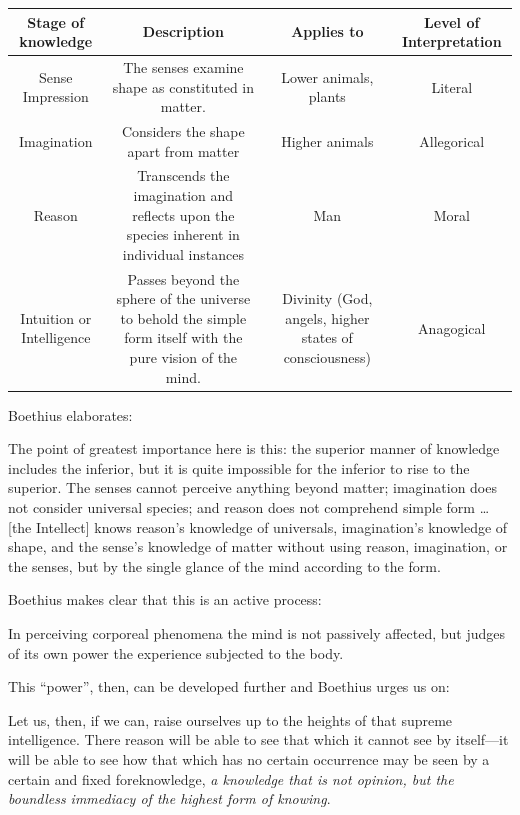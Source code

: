 \begin{table}[h]\scriptsize
\begin{tabular}{cccc}\toprule 
Stage of knowledge &
Description &
Applies to &
Level of Interpretation\\\midrule
Sense Impression &
The senses examine shape as constituted in matter. &
Lower animals, plants &
Literal\\\midrule
Imagination &
Considers the shape apart from matter &
Higher animals &
Allegorical\\\midrule
Reason &
Transcends the imagination and reflects upon the species inherent in individual instances &
Man &
Moral\\\midrule
Intuition or Intelligence &
Passes beyond the sphere of the universe to behold the simple form itself with the pure vision of the mind. &
Divinity (God, angels, higher states of consciousness) &
Anagogical\\\bottomrule
\end{tabular}
\end{table}
Boethius elaborates:

\begin{quotex}
The point of greatest importance here is this: the superior manner of knowledge includes the inferior, but it is quite impossible for the inferior to rise to the superior. The senses cannot perceive anything beyond matter; imagination does not consider universal species; and reason does not comprehend simple form … [the Intellect] knows reason's knowledge of universals, imagination's knowledge of shape, and the sense's knowledge of matter without using reason, imagination, or the senses, but by the single glance of the mind according to the form.

\end{quotex}
Boethius makes clear that this is an active process:

\begin{quotex}
In perceiving corporeal phenomena the mind is not passively affected, but judges of its own power the experience subjected to the body.

\end{quotex}
This “power”, then, can be developed further and Boethius urges us on:

\begin{quotex}
Let us, then, if we can, raise ourselves up to the heights of that supreme intelligence. There reason will be able to see that which it cannot see by itself—it will be able to see how that which has no certain occurrence may be seen by a certain and fixed foreknowledge, \emph{a knowledge that is not opinion, but the boundless immediacy of the highest form of knowing}.

\end{quotex}
